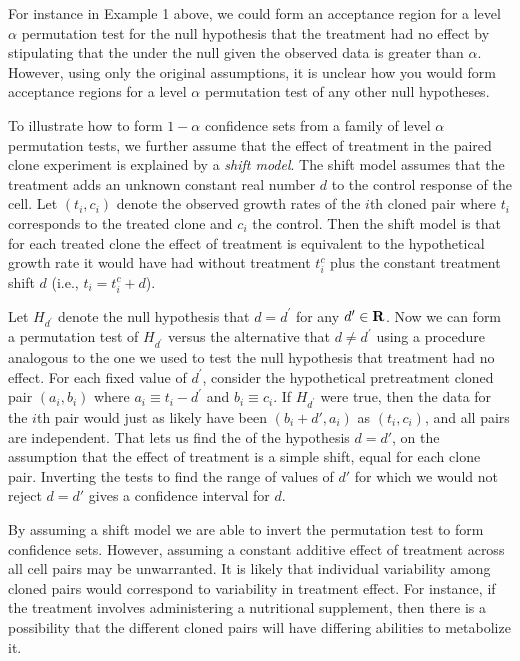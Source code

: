 For instance in Example 1 above, we could form an acceptance region for a level
$\alpha$ permutation test for the null hypothesis that the treatment had no
effect by stipulating that the \pvalue{} under the null given the observed data
is greater than $\alpha$.  However, using only the original assumptions, it is
unclear how you would form acceptance regions for a level $\alpha$ permutation
test of any other null hypotheses. 

\begin{example}[continues=exa:cont] To illustrate how to form $1-\alpha$
confidence sets from a family of level $\alpha$ permutation tests, we further
assume that the effect of treatment in the paired clone experiment is explained
by a \emph{shift model}.  The shift model assumes that the treatment
adds an unknown constant real number $d$ to the control response of the cell.
Let $(t_i, c_i)$ denote the observed growth rates of the $i$th cloned
pair where $t_i$ corresponds to the treated clone and $c_i$ the control.  Then
the shift model is that for each treated clone the effect of treatment is
equivalent to the hypothetical growth rate it would have had without treatment
$t_i^c$ plus the constant treatment shift $d$ (i.e., $t_i = t_i^c + d$).

Let $H_{d^\prime}$ denote the null hypothesis that $d=d^\prime$ for any
$d^\prime \in \mathbf{R}$.  Now we can form a permutation test of $H_{d^\prime}$
versus the alternative that $d \neq d^\prime$ using a procedure analogous to the
one we used to test the null hypothesis that treatment had no
effect. For each fixed value of $d^\prime$, consider the hypothetical
pretreatment cloned pair $(a_i, b_i)$ where $a_i\equiv t_i-d^\prime$ and $b_i
\equiv c_i$. If $H_{d^\prime}$ were true, then the data for the $i$th pair would
just as likely have been $(b_i+d', a_i)$ as $(t_i, c_i)$, and all pairs are
independent.
That lets us find the \pvalue{} of the hypothesis $d=d'$, on the assumption that
the effect of treatment is a simple shift, equal for each clone pair.
Inverting the tests to find the range of values of $d'$ for which we would not
reject $d=d'$ gives a confidence interval for $d$.

By assuming a shift model we are able to invert the permutation test to form
confidence sets.  However, assuming a constant additive
effect of treatment across all cell pairs may be unwarranted. It is likely
that individual variability among cloned pairs would correspond to variability
in treatment effect.  For instance, if the treatment involves administering a
nutritional supplement, then there is a possibility that the different cloned
pairs will have differing abilities to metabolize it.


\end{example}


